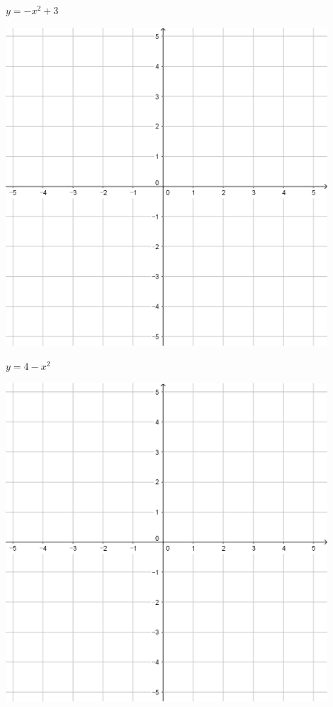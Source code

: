 \documentclass{oblivoir}
\begin{document}
\clearpage
\begin{minipage}{0.45\textwidth}\centering
\(y=-x^2+3\)
\par\bigskip\includegraphics[width=0.9\textwidth]{55}
\end{minipage}
\begin{minipage}{0.45\textwidth}\centering
\(y=4-x^2\)
\par\bigskip\includegraphics[width=0.9\textwidth]{55}
\end{minipage}\bigskip\bigskip\par
\end{document}
